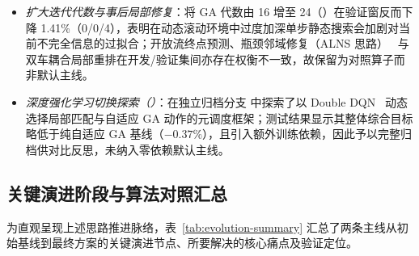 \begin{enumerate}
\begin{itemize}
    \item \emph{扩大迭代代数与事后局部修复}：将 GA 代数由 16 增至 24（）在验证窗反而下降 1.41\%（0/0/4），表明在动态滚动环境中过度加深单步静态搜索会加剧对当前不完全信息的过拟合；开放流终点预测、瓶颈邻域修复（ALNS 思路）~\cite{ropke2006alns} 与双车耦合局部重排在开发/验证集间亦存在权衡不一致，故保留为对照算子而非默认主线。
    \item \emph{深度强化学习切换探索（）}：在独立归档分支  中探索了以 Double DQN~\cite{vanhasselt2016ddqn} 动态选择局部匹配与自适应 GA 动作的元调度框架；测试结果显示其整体综合目标略低于纯自适应 GA 基线（$-0.37\%$），且引入额外训练依赖，因此予以完整归档供对比反思，未纳入零依赖默认主线。
  \end{itemize}
\end{enumerate}

\subsection{关键演进阶段与算法对照汇总}

为直观呈现上述思路推进脉络，表~\ref{tab:evolution-summary} 汇总了两条主线从初始基线到最终方案的关键演进节点、所要解决的核心痛点及验证定位。

